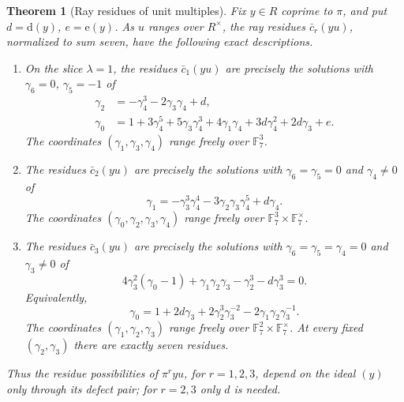 \documentclass[11pt]{amsart}
\theoremstyle{plain}
\newtheorem{theorem}{Theorem}[section]
\theoremstyle{definition}
\numberwithin{equation}{section}
\newcommand{\F}{\mathbb F}
\newcommand{\dd}{\mathrm d}
\newcommand{\ee}{\mathrm e}
\begin{document}
\begin{theorem}[Ray residues of unit multiples]\label{thm:twisted}
Fix $y\in R$ coprime to $\pi$, and put $d=\dd(y)$, $e=\ee(y)$.
As $u$ ranges over $R^\times$, the ray residues $\bar c_r(yu)$,
normalized to sum seven, have the following exact descriptions.
\begin{enumerate}
\item[(a)] On the slice $\lambda=1$, the residues $\bar c_1(yu)$
are precisely the solutions with $\gamma_6=0$, $\gamma_5=-1$ of
\begin{align*}
 \gamma_2&=-\gamma_4^3-2\gamma_3\gamma_4+d,\\
 \gamma_0&=1+3\gamma_4^5+5\gamma_3\gamma_4^3+4\gamma_1\gamma_4
                  +3d\gamma_4^2+2d\gamma_3+e.
\end{align*}
The coordinates $(\gamma_1,\gamma_3,\gamma_4)$ range freely over $\F_7^3$.
\item[(b)] The residues $\bar c_2(yu)$ are precisely the solutions with
$\gamma_6=\gamma_5=0$ and $\gamma_4\ne0$ of
\[
 \gamma_1=-\gamma_3^3\gamma_4^4
                -3\gamma_2\gamma_3\gamma_4^5+d\gamma_4.
\]
The coordinates $(\gamma_0,\gamma_2,\gamma_3,\gamma_4)$ range freely
over $\F_7^3\times\F_7^\times$.
\item[(c)] The residues $\bar c_3(yu)$ are precisely the solutions with
$\gamma_6=\gamma_5=\gamma_4=0$ and $\gamma_3\ne0$ of
\begin{equation}\label{eq:twisted-third}
 4\gamma_3^2(\gamma_0-1)+\gamma_1\gamma_2\gamma_3
              -\gamma_2^3-d\gamma_3^3=0.
\end{equation}
Equivalently,
\begin{equation}\label{eq:twisted-third-solved}
 \gamma_0=1+2d\gamma_3+2\gamma_2^3\gamma_3^{-2}
                              -2\gamma_1\gamma_2\gamma_3^{-1}.
\end{equation}
The coordinates $(\gamma_1,\gamma_2,\gamma_3)$ range freely over
$\F_7^2\times\F_7^\times$.  At every fixed
$(\gamma_2,\gamma_3)$ there are exactly seven residues.
\end{enumerate}
Thus the residue possibilities of $\pi^ryu$, for $r=1,2,3$, depend on
the ideal $(y)$ only through its defect pair; for $r=2,3$ only $d$ is
needed.
\end{theorem}
\end{document}
